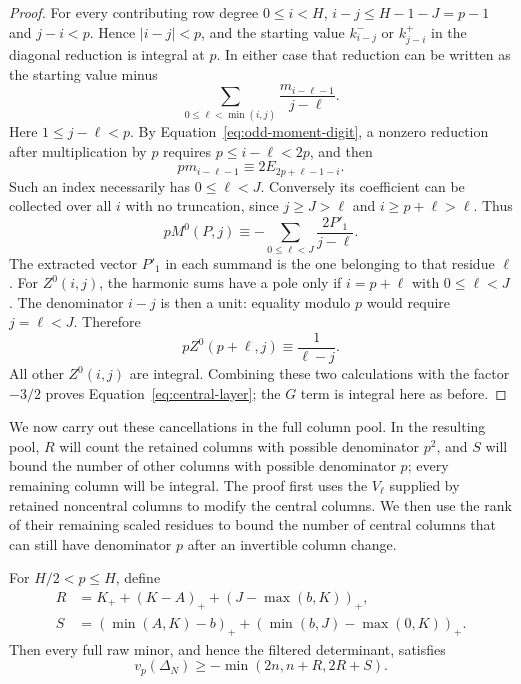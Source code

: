 \begin{proof}
For every contributing row degree $0\le i<H$,
$i-j\le H-1-J=p-1$ and $j-i<p$.  Hence $|i-j|<p$, and the
starting value $k^-_{i-j}$ or $k^+_{j-i}$ in the diagonal reduction
is integral at $p$.  In either case that reduction can be written as
the starting value minus
\[
 \sum_{0\le\ell<\min(i,j)}\frac{m_{i-\ell-1}}{j-\ell}.
\]
Here $1\le j-\ell<p$.  By Equation~\eqref{eq:odd-moment-digit}, a
nonzero reduction after multiplication by $p$ requires
$p\le i-\ell<2p$, and then
\[
 pm_{i-\ell-1}\equiv2E_{2p+\ell-1-i}.
\]
Such an index necessarily has $0\le\ell<J$.  Conversely its
coefficient can be collected over all $i$ with no truncation, since
$j\ge J>\ell$ and $i\ge p+\ell>\ell$.  Thus
\[
 pM^0(P,j)\equiv-\sum_{0\le\ell<J}\frac{2P'_1}{j-\ell}.
\]
The extracted vector $P'_1$ in each summand is the one belonging to
that residue $\ell$.
For $Z^0(i,j)$, the harmonic sums have a pole only if
$i=p+\ell$ with $0\le\ell<J$.  The denominator $i-j$ is then a
unit: equality modulo $p$ would require $j=\ell<J$.  Therefore
\[
 pZ^0(p+\ell,j)\equiv\frac1{\ell-j}.
\]
All other $Z^0(i,j)$ are integral.  Combining these two calculations
with the factor $-3/2$ proves Equation~\eqref{eq:central-layer}; the
$G$ term is integral here as before.
\end{proof}

We now carry out these cancellations in the full column pool.  In the
resulting pool, $R$ will count the retained columns with possible
denominator $p^2$, and $S$ will bound the number of other columns with
possible denominator $p$; every remaining column will be integral.
The proof first uses the $V_\ell$ supplied by retained noncentral
columns to modify the central columns.  We then use the rank of their
remaining scaled residues to bound the number of central columns that
can still have denominator $p$ after an invertible column change.

\begin{lemma}
\label{lem:odd-local-elimination}
For $H/2<p\le H$, define
\begin{align*}
 R&=K_++(K-A)_++(J-\max(b,K))_+,\\
 S&=(\min(A,K)-b)_+
        +(\min(b,J)-\max(0,K))_+.
\end{align*}
Then every full raw minor, and hence the filtered determinant, satisfies
\begin{equation}\label{eq:odd-two-layer-bound}
 v_p(\Delta_N)\ge-\min(2n,n+R,2R+S).
\end{equation}
\end{lemma}

